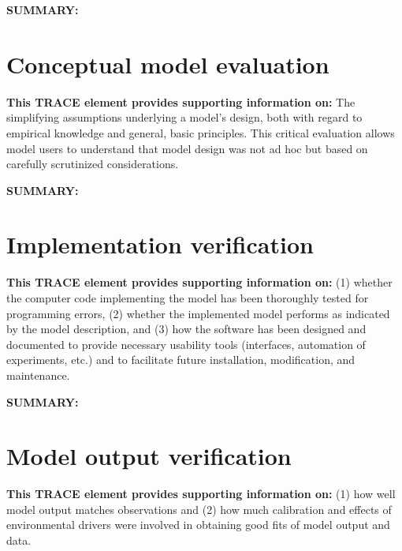 \documentclass[a4paper, 11pt, parskip = full]{scrartcl}
\begin{document}
\textbf{SUMMARY:}
\begin{addmargin}[3em]{2em}
\textbf{

}
\end{addmargin}



\clearpage
\section{Conceptual model evaluation}
\textbf{This TRACE element provides supporting information on:} The simplifying assumptions underlying a model's
design, both  with regard to empirical knowledge and general, basic principles. This critical evaluation allows model
users to understand that model design was not ad hoc but based on carefully scrutinized considerations.

\textbf{SUMMARY:}
\begin{addmargin}[3em]{2em}
\textbf{

}
\end{addmargin}



\clearpage
\section{Implementation verification}
\textbf{This TRACE element provides supporting information on:} (1) whether the computer code implementing the model
has been thoroughly tested for programming errors, (2) whether the implemented model performs as indicated by the model
description, and (3) how the software has been designed and documented to provide necessary usability tools
(interfaces, automation of experiments, etc.) and to facilitate future installation, modification, and maintenance.

\textbf{SUMMARY:}
\begin{addmargin}[3em]{2em}
\textbf{

}
\end{addmargin}



\clearpage
\section{Model output verification}
\textbf{This TRACE element provides supporting information on:} (1) how well model output matches observations and
(2) how much calibration and effects of environmental drivers were involved in obtaining good fits of model output
and data.
\end{document}
